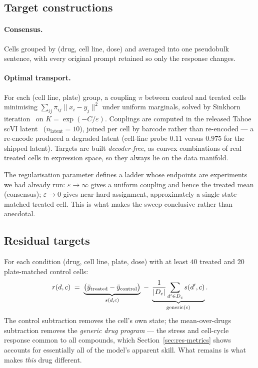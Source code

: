 \subsection{Target constructions}

\paragraph{Consensus.} Cells grouped by (drug, cell line, dose) and averaged into one pseudobulk
sentence, with every original prompt retained so only the response changes.

\paragraph{Optimal transport.} For each (cell line, plate) group, a coupling $\pi$ between control
and treated cells minimising $\sum_{ij}\pi_{ij}\lVert x_i - y_j\rVert^2$ under uniform marginals,
solved by Sinkhorn iteration~\cite{cuturi} on $K = \exp(-C/\varepsilon)$. Couplings are computed in
the released Tahoe scVI latent~\cite{scvi} ($n_{\textrm{latent}} = 10$), joined per cell by barcode
rather than re-encoded --- a re-encode produced a degraded latent (cell-line probe $0.11$ versus
$0.975$ for the shipped latent). Targets are built \emph{decoder-free}, as convex combinations of
real treated cells in expression space, so they always lie on the data manifold.

The regularisation parameter defines a ladder whose endpoints are experiments we had already run:
$\varepsilon\rightarrow\infty$ gives a uniform coupling and hence the treated mean (consensus);
$\varepsilon\rightarrow 0$ gives near-hard assignment, approximately a single state-matched treated
cell. This is what makes the sweep conclusive rather than anecdotal.

\subsection{Residual targets}
\label{sec:methods-residual}

For each condition (drug, cell line, plate, dose) with at least $40$ treated and $20$ plate-matched
control cells:
\begin{equation}
  r(d,c) \;=\; \underbrace{\big(\bar{y}_{\textrm{treated}} - \bar{y}_{\textrm{control}}\big)}_{s(d,c)}
  \;-\; \underbrace{\frac{1}{|D_c|}\sum_{d' \in D_c} s(d',c)}_{\textrm{generic}(c)} .
\end{equation}
The control subtraction removes the cell's own state; the mean-over-drugs subtraction removes the
\emph{generic drug program} --- the stress and cell-cycle response common to all compounds, which
Section~\ref{sec:res-metrics} shows accounts for essentially all of the model's apparent skill. What
remains is what makes \emph{this} drug different.

